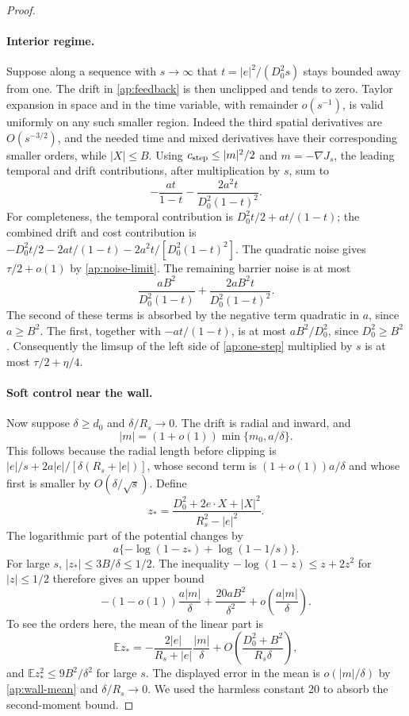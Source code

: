 \documentclass[11pt]{article}
\numberwithin{equation}{section}
\theoremstyle{definition}
\theoremstyle{remark}
\begin{document}
\begin{proof}
\paragraph{Interior regime.}
Suppose along a sequence with \(s\to\infty\) that
\(t=|e|^2/(D_0^2s)\) stays bounded away from one.  The drift in
\eqref{ap:feedback} is then unclipped and tends to zero.  Taylor
expansion in space and in the time variable, with remainder \(o(s^{-1})\),
is valid uniformly on any such smaller region.  Indeed the third spatial
derivatives are \(O(s^{-3/2})\), and the needed time and mixed
derivatives have their corresponding smaller orders, while \(|X|\leq B\).
Using \(c_{\rm step}\leq |m|^2/2\) and \(m=-\nabla J_s\), the leading temporal
and drift contributions, after multiplication by \(s\), sum to
\[
 -\frac{at}{1-t}
 -\frac{2a^2t}{D_0^2(1-t)^2}.
\]
For completeness, the temporal contribution is
\(D_0^2t/2+at/(1-t)\); the combined drift and cost contribution is
\(-D_0^2t/2-2at/(1-t)-2a^2t/[D_0^2(1-t)^2]\).
The quadratic noise gives \(\tau/2+o(1)\) by
\eqref{ap:noise-limit}.  The remaining barrier noise is at most
\[
 \frac{aB^2}{D_0^2(1-t)}
 +\frac{2aB^2t}{D_0^2(1-t)^2}.
\]
The second of these terms is absorbed by the negative term quadratic
in \(a\), since \(a\geq B^2\).  The first, together with
\(-at/(1-t)\), is at most \(aB^2/D_0^2\), since \(D_0^2\geq B^2\).
Consequently the limsup of the left side of \eqref{ap:one-step}
multiplied by \(s\) is at most \(\tau/2+\eta/4\).

\paragraph{Soft control near the wall.}
Now suppose \(\delta\geq d_0\) and \(\delta/R_s\to0\).  The drift
is radial and inward, and
\begin{equation}\label{ap:wall-mean}
 |m|=(1+o(1))\min\{m_0,a/\delta\}.
\end{equation}
This follows because the radial length before clipping is
\(|e|/s+2a|e|/[\delta(R_s+|e|)]\), whose second term is
\((1+o(1))a/\delta\) and whose first is smaller by
\(O(\delta/\sqrt s)\).  Define
\[
 z_*=\frac{D_0^2+2e\cdot X+|X|^2}{R_s^2-|e|^2}.
\]
The logarithmic part of the potential changes by
\[
 a\{-\log(1-z_*)+\log(1-1/s)\}.
\]
For large \(s\), \(|z_*|\leq3B/\delta\leq1/2\).  The inequality
\(-\log(1-z)\leq z+2z^2\) for \(|z|\leq1/2\) therefore gives an
upper bound
\begin{equation}\label{ap:wall-barrier}
 -(1-o(1))\frac{a|m|}{\delta}
 +\frac{20aB^2}{\delta^2}
 +o\left(\frac{a|m|}{\delta}\right).
\end{equation}
To see the orders here, the mean of the linear part is
\[
 \mathbb E z_*
 =-\frac{2|e|}{R_s+|e|}\frac{|m|}{\delta}
   +O\left(\frac{D_0^2+B^2}{R_s\delta}\right),
\]
and \(\mathbb E z_*^2\leq9B^2/\delta^2\) for large \(s\).
The displayed error in the mean is
\(o(|m|/\delta)\) by \eqref{ap:wall-mean} and
\(\delta/R_s\to0\).  We used the harmless constant 20 to absorb
the second-moment bound.


\end{proof}
\end{document}
